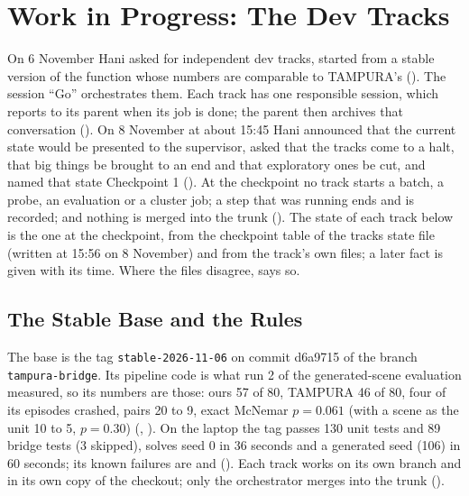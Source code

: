 
\chapter{Work in Progress: The Dev Tracks}
\label{ch:progress}

On 6 November Hani asked for independent dev tracks, started from a stable version
of the function whose numbers are comparable to TAMPURA's (). The session
``Go'' orchestrates them. Each track has one responsible session, which reports to
its parent when its job is done; the parent then archives that conversation
(). On 8 November at about 15:45 Hani announced that the current state would
be presented to the supervisor, asked that the tracks come to a halt, that big things
be brought to an end and that exploratory ones be cut, and named that state
Checkpoint 1 (). At the checkpoint no track starts a batch, a probe, an
evaluation or a cluster job; a step that was running ends and is recorded; and nothing
is merged into the trunk (). The state of each
track below is the one at the checkpoint, from the checkpoint table of the tracks
state file (written at 15:56 on 8 November) and from the track's own files; a later
fact is given with its time. Where the files disagree,  says
so.

\section{The Stable Base and the Rules}
\label{sec:tracks-base}

The base is the tag \texttt{stable-2026-11-06} on commit d6a9715 of the branch
\texttt{tampura-bridge}. Its pipeline code is what run 2 of the generated-scene
evaluation measured, so its numbers are those: ours 57 of 80, TAMPURA 46 of 80, four of
its episodes crashed, pairs 20 to 9, exact McNemar $p = 0.061$ (with a scene as the unit
10 to 5, $p = 0.30$) (, ).  On the laptop the tag passes 130
unit tests and 89 bridge tests (3 skipped), solves seed 0 in 36 seconds and a
generated seed (106) in 60 seconds; its known failures are  and 
(). Each track works on its own branch and in its own copy of the checkout;
only the orchestrator merges into the trunk ().

